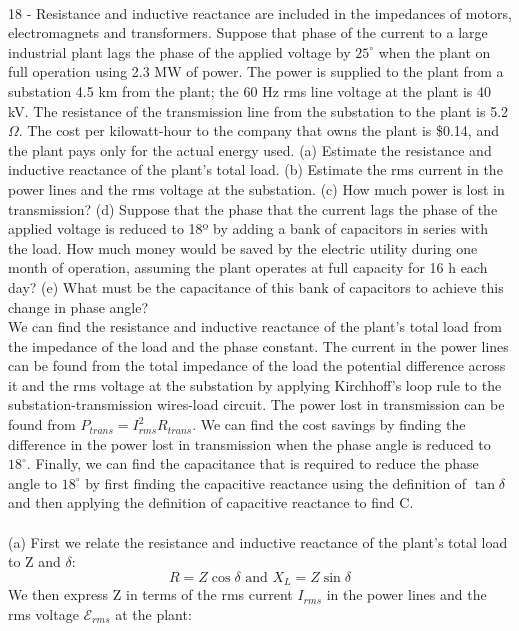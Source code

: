 \documentclass{report}
\begin{document}
\paragraph{}
18 - Resistance and inductive reactance are included in the impedances of motors, electromagnets and transformers. Suppose that phase of the current to a large industrial plant lags the phase of the applied voltage by $25^{\circ}$ when the plant on full operation using 2.3 MW of power.  The power is supplied to the plant from a substation 4.5 km from the plant; the 60 Hz rms line voltage at the plant is 40 kV. The resistance of the transmission line from the substation to the
plant is 5.2 $\Omega$. The cost per kilowatt-hour to the company that owns the plant is \$0.14, and the plant pays only for the actual energy used. (a) Estimate the resistance and inductive reactance of the plant’s total load. (b) Estimate the rms current in the power lines and the rms voltage at the substation. (c) How much power is lost in transmission? (d) Suppose that the phase that the current lags the phase of the applied voltage is reduced to 18º by adding a bank of capacitors in series with the load. How much money would be saved by the electric utility during one month of operation, assuming the plant operates at full capacity for 16 h each day? (e) What must be the capacitance of this bank of capacitors to achieve this change in phase angle?\\
We can find the resistance and inductive reactance of the plant’s total load from the impedance of the load and the phase constant. The current in the power lines can be found from the total impedance of the load the potential difference across it and the rms voltage at the substation by applying Kirchhoff’s loop rule to the substation-transmission wires-load circuit. The power lost in transmission can be found from $P_{trans} = I_{rms}^2 R_{trans}$. We can find the cost savings by finding the difference in the power lost in transmission when the phase angle is reduced to $18^{\circ}$. Finally, we can find the capacitance that is required to reduce the phase angle to $18^{\circ}$ by first finding the capacitive reactance using the definition of $\tan \delta$ and then applying the definition of capacitive reactance to find C.\\
\\
(a) First we relate the resistance and inductive reactance of the plant's total load to Z and $\delta$:
$$R = Z \cos \delta \text{ and } X_L = Z \sin \delta$$
We then express Z in terms of the rms current $I_{rms}$ in the power lines and the rms voltage $\mathcal{E}_{rms}$ at the plant:
\end{document}
